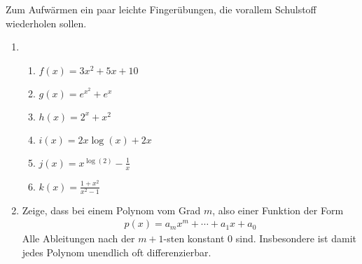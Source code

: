 \begin{exercise}
  Zum Aufwärmen ein paar leichte Fingerübungen, die vorallem Schulstoff
  wiederholen sollen.
  \begin{enumerate}[label=(\alph*)]
  \item
    \begin{enumerate}
    \item $f(x) = 3x^2 + 5x + 10$
    \item $g(x) = e^{x^2}+ e^x$
    \item $h(x) = 2^{x}+ x^2$
    \item $i(x) = 2x\log(x) + 2x$
    \item $j(x) = x^{\log(2)} - \frac{1}{x} $
    \item $k(x) = \frac{1+ x^2}{x^2 - 1}$
    \end{enumerate}
  \item Zeige, dass bei einem Polynom vom Grad $m$, also einer Funktion der Form
    \begin{equation*}
      \begin{split}
        p(x) = a_m x^{m} + \cdots + a_1 x + a_0
      \end{split}
    \end{equation*}
    Alle Ableitungen nach der $m+1$-sten konstant $0$ sind. Insbesondere ist
    damit jedes Polynom unendlich oft differenzierbar.
  \end{enumerate}
\end{exercise}
